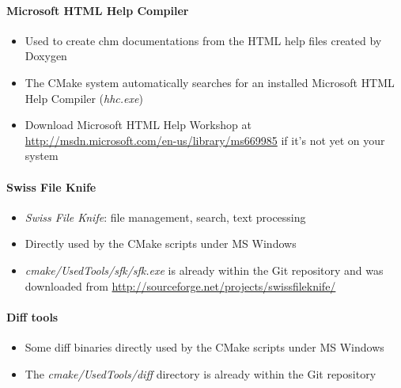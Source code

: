\paragraph{Microsoft \ac{HTML} Help Compiler}
\begin{itemize}
\item{Used to create chm documentations from the \ac{HTML} help files created by Doxygen}
\item{The CMake system automatically searches for an installed Microsoft \ac{HTML} Help Compiler (\emph{hhc.exe})}
\item{Download Microsoft \ac{HTML} Help Workshop at \url{http://msdn.microsoft.com/en-us/library/ms669985} if it's not yet on your system}
\end{itemize}


\paragraph{Swiss File Knife}
\begin{itemize}
\item{\emph{Swiss File Knife}: file management, search, text processing}
\item{Directly used by the CMake scripts under MS Windows}
\item{\emph{cmake/UsedTools/sfk/sfk.exe} is already within the Git repository and was downloaded from \url{http://sourceforge.net/projects/swissfileknife/}}
\end{itemize}


\paragraph{Diff tools}
\begin{itemize}
\item{Some diff binaries directly used by the CMake scripts under MS Windows}
\item{The \emph{cmake/UsedTools/diff} directory is already within the Git repository}
\end{itemize}





